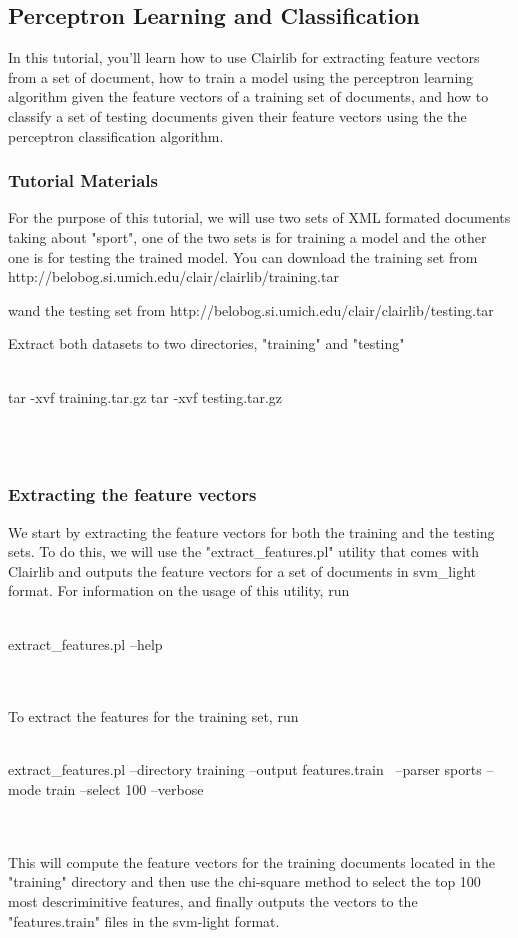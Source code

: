 \subsection{Perceptron Learning and Classification}
In this tutorial, you'll learn how to use Clairlib for extracting feature vectors from a set of document, how to train a model using the perceptron learning algorithm given the feature vectors of a training set of documents, and how to classify a set of testing documents given their feature vectors using the the perceptron classification algorithm.

\subsubsection{Tutorial Materials}
For the purpose of this tutorial, we will use two sets of XML formated documents taking about "sport", one of the two sets is for training a model and the other one is for testing the trained model. You can download the training set from http://belobog.si.umich.edu/clair/clairlib/training.tar

wand the testing set from http://belobog.si.umich.edu/clair/clairlib/testing.tar

Extract both datasets to two directories, "training" and "testing"
\\
\\
\begin{boxedverbatim}
 tar -xvf training.tar.gz
 tar -xvf testing.tar.gz
\end{boxedverbatim}
\\
\\
\subsubsection{Extracting the feature vectors}
We start by extracting the feature vectors for both the training and the testing sets. To do this, we will use the "extract\_features.pl" utility that comes with Clairlib and outputs the feature vectors for a set of documents in svm\_light format. For information on the usage of this utility, run
\\
\\
\begin{boxedverbatim}
 extract_features.pl --help
\end{boxedverbatim}
\\
\\
To extract the features for the training set, run
\\
\\
\begin{boxedverbatim}
 extract_features.pl --directory training --output features.train \
 --parser sports --mode train --select 100 --verbose
\end{boxedverbatim}
\\
\\
This will compute the feature vectors for the training documents located in the "training" directory and then use the chi-square method to select the top 100 most descriminitive features, and finally outputs the vectors to the "features.train" files in the svm-light format.

